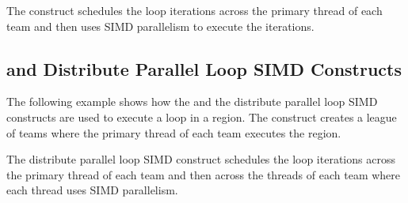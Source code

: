 The   construct schedules the loop iterations across 
the primary thread of each team and then uses SIMD parallelism to execute the iterations.



\subsection{  and Distribute Parallel Loop SIMD Constructs}
\label{subsec:teams_distribute_parallel_simd}

The following example shows how the   and the distribute 
parallel loop SIMD constructs are used to execute a loop in a   
region. The   construct creates a league of teams 
where the primary thread of each team executes the  region.

The distribute parallel loop SIMD construct schedules the loop iterations across 
the primary thread of each team and then across the threads of each team where each 
thread uses SIMD parallelism.



